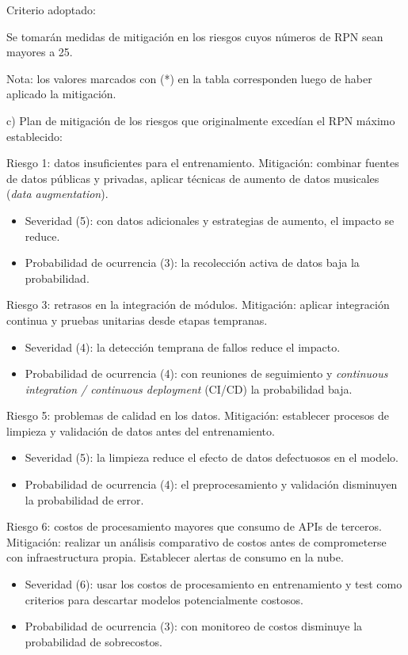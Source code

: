\documentclass[
11pt, %
]{charter}
\begin{document}
Criterio adoptado: 

Se tomarán medidas de mitigación en los riesgos cuyos números de RPN sean mayores a 25.


Nota: los valores marcados con (*) en la tabla corresponden luego de haber aplicado la mitigación.

c) Plan de mitigación de los riesgos que originalmente excedían el RPN máximo establecido:
 
Riesgo 1: datos insuficientes para el entrenamiento.
  Mitigación: combinar fuentes de datos públicas y privadas, aplicar técnicas de aumento de datos musicales (\textit{data augmentation}).  
  \begin{itemize}
    \item Severidad (5): con datos adicionales y estrategias de aumento, el impacto se reduce.
    \item Probabilidad de ocurrencia (3): la recolección activa de datos baja la probabilidad.
	\end{itemize}

Riesgo 3: retrasos en la integración de módulos.
  Mitigación: aplicar integración continua y pruebas unitarias desde etapas tempranas.  
  \begin{itemize}
    \item Severidad (4): la detección temprana de fallos reduce el impacto.
    \item Probabilidad de ocurrencia (4): con reuniones de seguimiento y \textit{continuous integration / continuous deployment} (CI/CD) la probabilidad baja.
  \end{itemize}

Riesgo 5: problemas de calidad en los datos.  
  Mitigación: establecer procesos de limpieza y validación de datos antes del entrenamiento.  
\begin{itemize}
	\item Severidad (5): la limpieza reduce el efecto de datos defectuosos en el modelo.
	\item Probabilidad de ocurrencia (4): el preprocesamiento y validación disminuyen la probabilidad de error.
\end{itemize}

Riesgo 6: costos de procesamiento mayores que consumo de APIs de terceros.  
  Mitigación: realizar un análisis comparativo de costos antes de comprometerse con infraestructura propia. Establecer alertas de consumo en la nube.  
\begin{itemize}
	\item Severidad (6): usar los costos de procesamiento en entrenamiento y test como criterios para descartar modelos potencialmente costosos.
	\item Probabilidad de ocurrencia (3): con monitoreo de costos disminuye la probabilidad de sobrecostos.
\end{itemize}
 
\end{document}

